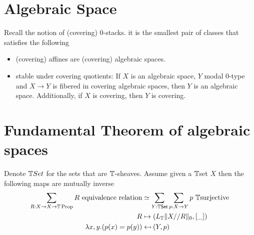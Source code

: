 \section{Algebraic Space}
Recall the notion of (covering) 0-stacks. it is the smallest pair of classes that satisfies the following
\begin{itemize}
	\item (covering) affines are (covering) algebraic spaces. %
	\item stable under covering quotients: If $X$ is an algebraic space, $Y$ modal 0-type and $X \to Y$ is fibered in covering algebraic spaces, then $Y$ is an algebraic space. Additionally, if $X$ is covering, then $Y$ is covering.
\end{itemize}
\section{Fundamental Theorem of algebraic spaces}

\begin{lemma}{\label{quotient-by-equivalence-relation}}
	Denote $\mathbb{T} Set$ for the sets that are $\mathbb{T}$-sheaves. Assume given a $\mathbb{T}$set  $X$ then the following maps are mutually inverse
	\begin{align*}
		\sum_{R:X\to X\to \bT\Prop} R\ \mathrm{equivalence\ relation} &\simeq \sum_{Y:\bT \mathrm{\Set}} \sum_{p:X\to Y} p\ \bT\mathrm{surjective} \\
		R &\mapsto (L_\bT \| X//R \|_0,[\_]) \\
		\lambda x,y.  (p(x)=p(y)) &\mapsfrom (Y,p) 
	\end{align*}
\end{lemma}

